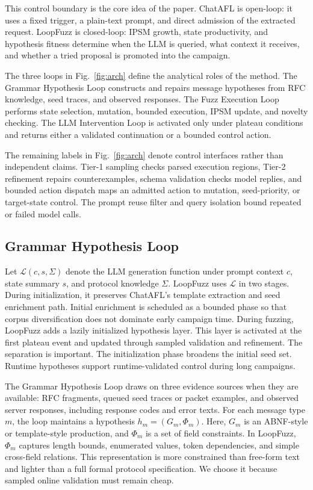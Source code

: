 \documentclass[final,5p,times,number]{elsarticle}
\begin{document}
This control boundary is the core idea of the paper. ChatAFL is open-loop: it uses a fixed trigger, a plain-text prompt, and direct admission of the extracted request. LoopFuzz is closed-loop: IPSM growth, state productivity, and hypothesis fitness determine when the LLM is queried, what context it receives, and whether a tried proposal is promoted into the campaign.

The three loops in Fig.~\ref{fig:arch} define the analytical roles of the method. The Grammar Hypothesis Loop constructs and repairs message hypotheses from RFC knowledge, seed traces, and observed responses. The Fuzz Execution Loop performs state selection, mutation, bounded execution, IPSM update, and novelty checking. The LLM Intervention Loop is activated only under plateau conditions and returns either a validated continuation or a bounded control action.

The remaining labels in Fig.~\ref{fig:arch} denote control interfaces rather than independent claims. Tier-1 sampling checks parsed execution regions, Tier-2 refinement repairs counterexamples, schema validation checks model replies, and bounded action dispatch maps an admitted action to mutation, seed-priority, or target-state control. The prompt reuse filter and query isolation bound repeated or failed model calls.

\subsection{Grammar Hypothesis Loop}
Let $\mathcal{L}(c, s, \Sigma)$ denote the LLM generation function under prompt context $c$, state summary $s$, and protocol knowledge $\Sigma$. LoopFuzz uses $\mathcal{L}$ in two stages. During initialization, it preserves ChatAFL's template extraction and seed enrichment path. Initial enrichment is scheduled as a bounded phase so that corpus diversification does not dominate early campaign time. During fuzzing, LoopFuzz adds a lazily initialized hypothesis layer. This layer is activated at the first plateau event and updated through sampled validation and refinement. The separation is important. The initialization phase broadens the initial seed set. Runtime hypotheses support runtime-validated control during long campaigns.

The Grammar Hypothesis Loop draws on three evidence sources when they are available: RFC fragments, queued seed traces or packet examples, and observed server responses, including response codes and error texts. For each message type $m$, the loop maintains a hypothesis $h_m=(G_m,\Phi_m)$. Here, $G_m$ is an ABNF-style or template-style production, and $\Phi_m$ is a set of field constraints. In LoopFuzz, $\Phi_m$ captures length bounds, enumerated values, token dependencies, and simple cross-field relations. This representation is more constrained than free-form text and lighter than a full formal protocol specification. We choose it because sampled online validation must remain cheap.
\end{document}
